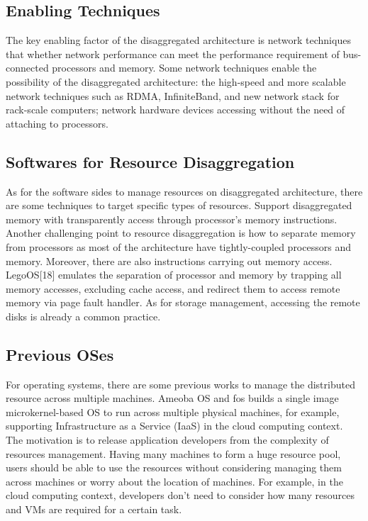 \documentclass[twocolumn]{article}
\begin{document}
\subsection{Enabling Techniques}
The key enabling factor of the disaggregated architecture is network techniques that whether network performance can meet the performance requirement of bus-connected processors and memory\cite{Network_requirement}. Some network techniques enable the possibility of the disaggregated architecture: the high-speed and more scalable network techniques such as RDMA\cite{RDMA}, InfiniteBand\cite{InfiniteBand}, and new network stack for rack-scale computers\cite{Network_stack_for_rack}; network hardware devices accessing without the need of attaching to processors\cite{NVM_performance, NVM_performance2}.

\subsection{Softwares for Resource Disaggregation}
As for the software sides to manage resources on disaggregated architecture, there are some techniques to target specific types of resources. Support disaggregated memory with transparently access through processor’s memory instructions\cite{Disaggregated_memory, Disaggregated_memory2}. Another challenging point to resource disaggregation is how to separate memory from processors as most of the architecture have tightly-coupled processors and memory. Moreover, there are also instructions carrying out memory access. LegoOS[18] emulates the separation of processor and memory by trapping all memory accesses, excluding cache access, and redirect them to access remote memory via page fault handler. As for storage management, accessing the remote disks is already a common practice\cite{VMware_virtual_SAN, Amazon_EC2_root_volume}.

\subsection{Previous OSes}
For operating systems, there are some previous works to manage the distributed resource across multiple machines. Ameoba OS\cite{Amoeba_OS} and fos\cite{fos} builds a single image microkernel-based OS to run across multiple physical machines, for example, supporting Infrastructure as a Service (IaaS) in the cloud computing context. The motivation is to release application developers from the complexity of resources management. Having many machines to form a huge resource pool, users should be able to use the resources without considering managing them across machines or worry about the location of machines. For example, in the cloud computing context, developers don’t need to consider how many resources and VMs are required for a certain task.
\end{document}
